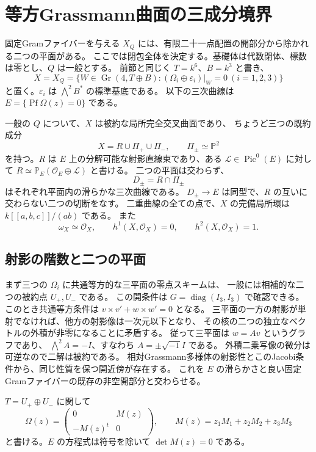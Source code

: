 \section{等方Grassmann曲面の三成分境界}
\label{sec:grassmann-boundary-v28}

固定Gramファイバーを与える $X_Q$ には、有限二十一点配置の開部分から除かれる二つの平面がある。
ここでは閉包全体を決定する。基礎体は代数閉体、標数は零とし、$Q$ は一般とする。
前節と同じく $T=k^6$、$B=k^3$ と書き、
\[
 X=X_Q=\{W\in\operatorname{Gr}(4,T\oplus B):
       (\Omega_i\oplus\varepsilon_i)|_W=0\ (i=1,2,3)\}
\]
と置く。$\varepsilon_i$ は $\bigwedge^2B^*$ の標準基底である。
以下の三次曲線は $E=\{\operatorname{Pf}\Omega(z)=0\}$ である。

\begin{theorem}[三成分の単純正規交差曲面]
\label{thm:grassmann-snc-v28}
一般の $Q$ について、$X$ は被約な局所完全交叉曲面であり、
ちょうど三つの既約成分
\[
 X=R\cup\Pi_+\cup\Pi_-,\qquad \Pi_\pm\simeq\mathbb P^2
\]
を持つ。$R$ は $E$ 上の分解可能な射影直線束であり、ある
$\mathcal L\in\operatorname{Pic}^0(E)$ に対して
$R\simeq\mathbb P_E(\mathcal O_E\oplus\mathcal L)$ と書ける。
二つの平面は交わらず、
\[
 D_\pm=R\cap\Pi_\pm
\]
はそれぞれ平面内の滑らかな三次曲線である。
$D_\pm\to E$ は同型で、$R$ の互いに交わらない二つの切断をなす。
二重曲線の全ての点で、$X$ の完備局所環は $k[[a,b,c]]/(ab)$ である。
また
\[
 \omega_X\simeq\mathcal O_X,\qquad
 h^1(X,\mathcal O_X)=0,\qquad h^2(X,\mathcal O_X)=1.
\]
\end{theorem}

\subsection{射影の階数と二つの平面}

まず三つの $\Omega_i$ に共通等方的な三平面の零点スキームは、
一般には相補的な二つの被約点 $U_+,U_-$ である。
この開条件は $G=\operatorname{diag}(I_3,I_3)$ で確認できる。
このとき共通等方条件は
$v\times v'+w\times w'=0$ となる。
三平面の一方の射影が単射でなければ、他方の射影像は一次元以下となり、
その核の二つの独立なベクトルの外積が非零になることに矛盾する。
従って三平面は $w=Av$ というグラフであり、
$\bigwedge^2A=-I$、すなわち $A=\pm\sqrt{-1}I$ である。
外積二乗写像の微分は可逆なので二解は被約である。
相対Grassmann多様体の射影性とこのJacobi条件から、同じ性質を保つ開近傍が存在する。
これを $E$ の滑らかさと良い固定Gramファイバーの既存の非空開部分と交わらせる。

$T=U_+\oplus U_-$ に関して
\begin{equation}\label{eq:cross-block-M-v28}
 \Omega(z)=\begin{pmatrix}0&M(z)\\-M(z)^t&0\end{pmatrix},
 \qquad M(z)=z_1M_1+z_2M_2+z_3M_3
\end{equation}
と書ける。$E$ の方程式は符号を除いて $\det M(z)=0$ である。

